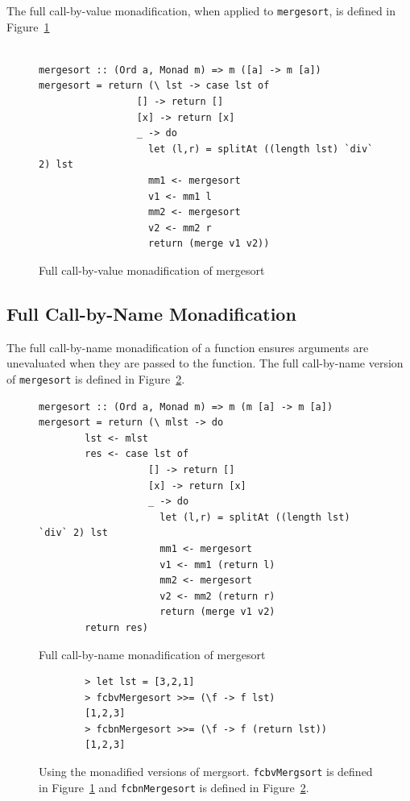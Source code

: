 The full call-by-value monadification, when applied to \texttt{mergesort}, is defined in Figure~\ref{fcbv}

\begin{figure}[t]
\begin{lstlisting}

mergesort :: (Ord a, Monad m) => m ([a] -> m [a])
mergesort = return (\ lst -> case lst of
                 [] -> return []
                 [x] -> return [x]
                 _ -> do
                   let (l,r) = splitAt ((length lst) `div` 2) lst
                   mm1 <- mergesort
                   v1 <- mm1 l
                   mm2 <- mergesort
                   v2 <- mm2 r
                   return (merge v1 v2))					
\end{lstlisting}
\caption{Full call-by-value monadification of mergesort}
\label{fcbv}
\end{figure}

\subsection{Full Call-by-Name Monadification}

The full call-by-name monadification of a function ensures arguments are unevaluated when they are passed to the function. The full call-by-name version of \texttt{mergesort} is defined in Figure~\ref{fcbn}.


\begin{figure}[t]
\begin{lstlisting}
mergesort :: (Ord a, Monad m) => m (m [a] -> m [a])
mergesort = return (\ mlst -> do
		lst <- mlst			
		res <- case lst of
                   [] -> return []
                   [x] -> return [x]
                   _ -> do
                     let (l,r) = splitAt ((length lst) `div` 2) lst
                     mm1 <- mergesort
                     v1 <- mm1 (return l)
                     mm2 <- mergesort
                     v2 <- mm2 (return r)
                     return (merge v1 v2)
		return res)					
\end{lstlisting}
\caption{Full call-by-name monadification of mergesort}
\label{fcbn}
\end{figure}

\begin{figure}[t]
	\begin{lstlisting}
		> let lst = [3,2,1]
		> fcbvMergesort >>= (\f -> f lst)
		[1,2,3]
		> fcbnMergesort >>= (\f -> f (return lst))
		[1,2,3]
	\end{lstlisting}
	\caption{Using the monadified versions of mergsort. \texttt{fcbvMergsort} is defined in Figure~\ref{fcbv} and \texttt{fcbnMergesort} is defined in Figure~\ref{fcbn}.}
	\label{fullMonadExs}
\end{figure}

